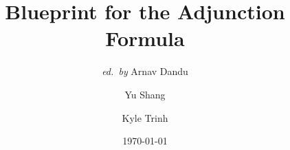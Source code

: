 \newtheorem{theorem}{Theorem}
\newtheorem*{theoremx}{Theorem} %
\newtheorem*{remarkx}{Remark} %
\newtheorem{lemma}[theorem]{Lemma}
\newtheorem{lemmax}[theorem]{Lemma} %
\newtheorem{corollary}[theorem]{Corollary}
\newtheorem{proposition}[theorem]{Proposition}
\newtheorem{conjecture}[theorem]{Conjecture}
\newtheorem{problem}[theorem]{Problem}
\newtheorem{assumption}[theorem]{Assumption}
\newtheorem{defprop}[theorem]{Definition/Proposition}

%
%



\theoremstyle{definition}
\newtheorem{remark}[theorem]{Remark}
\newtheorem{exercise}[theorem]{Exercise}
\newtheorem{warning}[theorem]{Warning}
\newtheorem{definition}[theorem]{Definition}
\newtheorem{question}[theorem]{Question}
\newtheorem{example}[theorem]{Example}
\newtheorem{examples}[theorem]{Examples}
\newtheorem{observation}[theorem]{Observation}

\newcommand{\pd}{\operatorname{pd}}
\renewcommand{\height}{\operatorname{height}}
\newcommand{\depth}{\operatorname{depth}}
\newcommand{\tor}{\operatorname{Tor}}
\newcommand{\la}{\langle}
\newcommand{\ra}{\rangle}


\date{\today}

\setcounter{tocdepth}{1}

\title{Blueprint for the Adjunction Formula}

\author{\textit{ed.\ by} Arnav Dandu \and Yu Shang \and Kyle Trinh}













\maketitle

